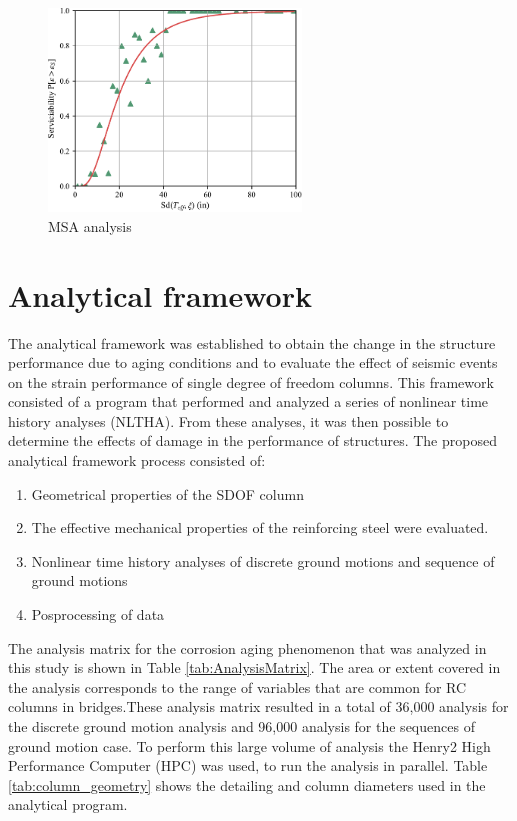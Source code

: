 \begin{figure}[htp]
	\centering
	\includegraphics[width=0.60\textwidth]{VAC Thesis 2.0/Chapter-5/figs/MSA_Calc.pdf}
	\caption{MSA analysis}
	\label{fig:msa_sample_01}
\end{figure}
\section{Analytical framework}

The analytical framework was established to obtain the change in the structure performance due to aging conditions and to evaluate the effect of seismic events on the strain performance of single degree of freedom columns. This framework consisted of a program that performed and analyzed a series of nonlinear time history analyses (NLTHA). From these analyses, it was then possible to determine the effects of damage in the performance of structures. The proposed analytical framework process consisted of:

\begin{enumerate}
	\item Geometrical properties of the SDOF column 
	\item The effective mechanical properties of the reinforcing steel were evaluated.
	\item Nonlinear time history analyses of discrete ground motions and sequence of ground motions
	\item Posprocessing of data
\end{enumerate}

The analysis matrix for the corrosion aging phenomenon that was analyzed in this study is shown in Table \ref{tab:AnalysisMatrix}. The area or extent covered in the analysis corresponds to the range of variables that are common for RC columns in bridges.These analysis matrix resulted in a total of 36,000 analysis for the discrete ground motion analysis and 96,000 analysis for the sequences of ground motion case. To perform this large volume of analysis the Henry2 High Performance Computer (HPC) was used, to run the analysis in parallel. Table \ref{tab:column_geometry} shows the detailing and column diameters used in the analytical program.

